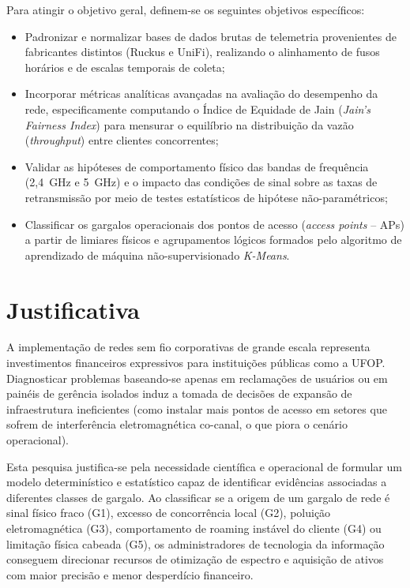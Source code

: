 Para atingir o objetivo geral, definem-se os seguintes objetivos específicos:
\begin{itemize}
	\item Padronizar e normalizar bases de dados brutas de telemetria provenientes de fabricantes distintos (Ruckus e UniFi), realizando o alinhamento de fusos horários e de escalas temporais de coleta;
	\item Incorporar métricas analíticas avançadas na avaliação do desempenho da rede, especificamente computando o Índice de Equidade de Jain (\textit{Jain's Fairness Index}) para mensurar o equilíbrio na distribuição da vazão (\textit{throughput}) entre clientes concorrentes;
	\item Validar as hipóteses de comportamento físico das bandas de frequência (2,4~GHz e 5~GHz) e o impacto das condições de sinal sobre as taxas de retransmissão por meio de testes estatísticos de hipótese não-paramétricos;
	\item Classificar os gargalos operacionais dos pontos de acesso (\textit{access points} -- \acsp{AP}) a partir de limiares físicos e agrupamentos lógicos formados pelo algoritmo de aprendizado de máquina não-supervisionado \textit{K-Means}.
\end{itemize}

\section{Justificativa}
\label{sec:justificativa}

A implementação de redes sem fio corporativas de grande escala representa investimentos financeiros expressivos para instituições públicas como a UFOP. Diagnosticar problemas baseando-se apenas em reclamações de usuários ou em painéis de gerência isolados induz a tomada de decisões de expansão de infraestrutura ineficientes (como instalar mais pontos de acesso em setores que sofrem de interferência eletromagnética co-canal, o que piora o cenário operacional). 

Esta pesquisa justifica-se pela necessidade científica e operacional de formular um modelo determinístico e estatístico capaz de identificar evidências associadas a diferentes classes de gargalo. Ao classificar se a origem de um gargalo de rede é sinal físico fraco (G1), excesso de concorrência local (G2), poluição eletromagnética (G3), comportamento de roaming instável do cliente (G4) ou limitação física cabeada (G5), os administradores de tecnologia da informação conseguem direcionar recursos de otimização de espectro e aquisição de ativos com maior precisão e menor desperdício financeiro.

